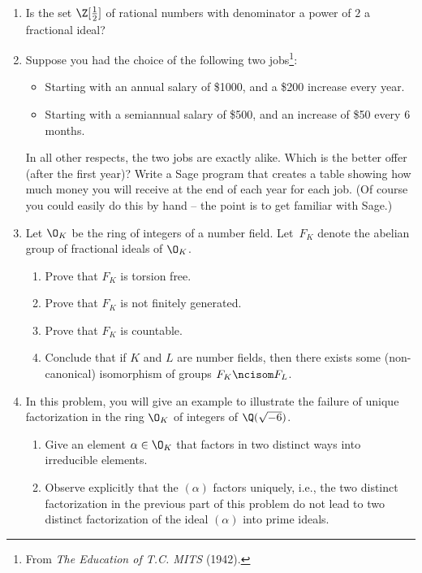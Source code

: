 \begin{enumerate}
\item Is the set $\Z[\frac{1}{2}]$ of rational numbers with
  denominator a power of $2$ a fractional ideal?

\item Suppose you had the choice of the following two jobs\footnote{From {\em The Education of T.C. MITS} (1942).}:
\begin{itemize}
\item[Job 1] Starting with an annual salary of \$1000,
and a \$200 increase every year.
\item[Job 2] Starting with a semiannual salary of \$500,
and an increase of \$50 every 6 months.
\end{itemize}
In all other respects, the two jobs are exactly alike.
Which is the better offer (after the first year)?  
Write a Sage program that creates a table showing how
much money you will receive at the end of each year for
each job. (Of course you could easily do this by hand -- the
point is to get familiar with Sage.)

\item Let $\O_K$ be the ring of integers of a number field.
Let~$F_K$ denote the abelian group of fractional ideals of $\O_K$.
\begin{enumerate}
\item Prove that $F_K$ is torsion free.
\item Prove that $F_K$ is not finitely generated.
\item Prove that $F_K$ is countable.
\item Conclude that if $K$ and $L$ are number fields, then there
exists some (non-canonical) isomorphism of groups $F_K\ncisom F_L$.
\end{enumerate}


\item In this problem, you will give an example to illustrate the
  failure of unique factorization in the ring $\O_K$ of integers of
  $\Q(\sqrt{-6})$.
\begin{enumerate}
\item Give an element $\alpha \in \O_K$ that factors in two distinct
  ways into irreducible elements.  
\item Observe explicitly that the $(\alpha)$ factors uniquely, i.e.,
  the two distinct factorization in the previous part of this problem
  do not lead to two distinct factorization of the ideal $(\alpha)$
  into prime ideals.
\end{enumerate}



\end{enumerate}
